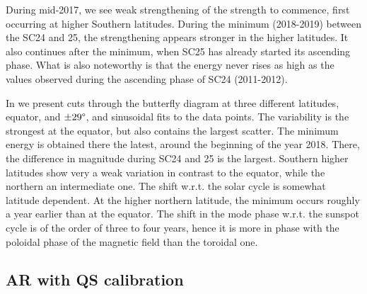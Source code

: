 \documentclass{aa}
\begin{document}
During mid-2017, we see weak strengthening of the \fff strength to commence, first occurring at higher Southern latitudes. During the minimum (2018-2019) between the SC24 and 25, the strengthening appears stronger in the higher latitudes. It also continues after the minimum, when 
SC25
has already started its ascending phase. What is also noteworthy is that the \fff
energy
never rises as high as the values observed during the ascending phase of SC24 (2011-2012).

In  we present cuts through the butterfly
diagram at three different latitudes, equator, and $\pm 29\degree$, and sinusoidal fits to the data points. The variability is the strongest at the equator, but also contains the largest scatter. The minimum \fff energy is obtained there the latest, around the beginning of the year 2018. There, the difference in magnitude during SC24 and 25 is the largest. Southern higher latitudes show very a weak variation in contrast to the equator, 
while the northern an intermediate one. 
The shift w.r.t. the solar cycle is somewhat latitude dependent. At the higher northern latitude, the \fff minimum occurs roughly a year earlier than at the equator. The shift in the \fff mode phase w.r.t. the sunspot cycle is of the order of three to four years, hence it is more in phase with the 
poloidal phase of the magnetic field than the toroidal one.

\subsection{AR \fff with QS calibration}\label{arf}
\end{document}
